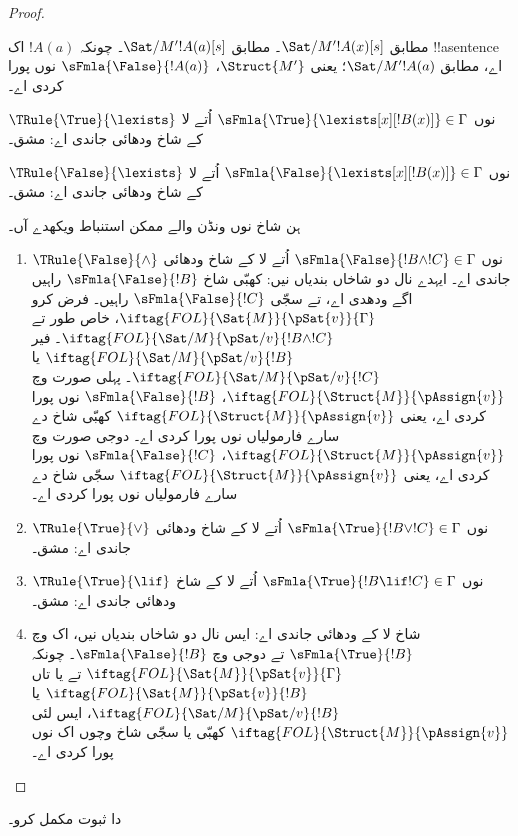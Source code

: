 \documentclass[../../../include/open-logic-section]{subfiles}
\begin{document}
\begin{proof}
\begin{enumerate}
{   مطابق
  $\Sat/{M'}{!A(x)}[s]$۔
   مطابق
  $\Sat/{M'}{!A(a)}[s]$۔ چونکہ $!A(a)$ اک !!a{sentence} اے،
   مطابق
  $\Sat/{M'}{!A(a)}$؛ یعنی $\Struct{M'}$،
  $\sFmla{\False}{!A(a)}$ نوں پورا کردی اے۔
\item $\TRule{\True}{\lexists}$ نوں
  $\sFmla{\True}{\lexists[x][!B(x)]} \in \Gamma$ اُتے لا کے شاخ ودھائی جاندی اے: مشق۔
\item $\TRule{\False}{\lexists}$ نوں
  $\sFmla{\False}{\lexists[x][!B(x)]} \in \Gamma$ اُتے لا کے شاخ ودھائی جاندی اے: مشق۔}{}
\end{enumerate}
ہن شاخ نوں ونڈن والے ممکن استنباط ویکھدے آں۔
\begin{enumerate}
\item $\TRule{\False}{\land}$ نوں
  $\sFmla{\False}{!B \land !C} \in \Gamma$ اُتے لا کے شاخ ودھائی جاندی اے۔ ایہدے نال
  دو شاخاں بندیاں نیں: کھبّی شاخ $\sFmla{\False}{!B}$ راہیں اگے
  ودھدی اے، تے سجّی $\sFmla{\False}{!C}$ راہیں۔ فرض کرو
  $\iftag{FOL}{\Sat{M}}{\pSat{v}}{\Gamma}$، خاص طور تے
  $\iftag{FOL}{\Sat/{M}}{\pSat/{v}}{!B \land !C}$۔ فیر
  $\iftag{FOL}{\Sat/{M}}{\pSat/{v}}{!B}$ یا
  $\iftag{FOL}{\Sat/{M}}{\pSat/{v}}{!C}$۔ پہلی صورت وچ
  $\iftag{FOL}{\Struct{M}}{\pAssign{v}}$،
  $\sFmla{\False}{!B}$ نوں پورا کردی اے، یعنی
  $\iftag{FOL}{\Struct{M}}{\pAssign{v}}$ کھبّی شاخ دے
  سارے فارمولیاں نوں پورا کردی اے۔ دوجی صورت وچ
  $\iftag{FOL}{\Struct{M}}{\pAssign{v}}$،
  $\sFmla{\False}{!C}$ نوں پورا کردی اے، یعنی
  $\iftag{FOL}{\Struct{M}}{\pAssign{v}}$ سجّی شاخ دے
  سارے فارمولیاں نوں پورا کردی اے۔
\item $\TRule{\True}{\lor}$ نوں
  $\sFmla{\True}{!B \lor !C} \in \Gamma$ اُتے لا کے شاخ ودھائی جاندی اے: مشق۔
\item $\TRule{\True}{\lif}$ نوں
  $\sFmla{\True}{!B \lif !C} \in \Gamma$ اُتے لا کے شاخ ودھائی جاندی اے: مشق۔
\item شاخ \Cut{} لا کے ودھائی جاندی اے: ایس نال دو شاخاں بندیاں
  نیں، اک وچ $\sFmla{\True}{!B}$ تے دوجی وچ
  $\sFmla{\False}{!B}$۔ چونکہ
  $\iftag{FOL}{\Sat{M}}{\pSat{v}}{\Gamma}$ تے یا تاں
  $\iftag{FOL}{\Sat{M}}{\pSat{v}}{!B}$ یا
  $\iftag{FOL}{\Sat/{M}}{\pSat/{v}}{!B}$، ایس لئی
  $\iftag{FOL}{\Struct{M}}{\pAssign{v}}$ کھبّی یا سجّی شاخ
  وچوں اک نوں پورا کردی اے۔
\end{enumerate}
\end{proof}

\begin{prob}
 دا ثبوت مکمل کرو۔
\end{prob}
\tagendprob
\end{document}
